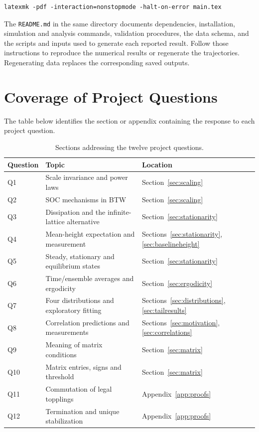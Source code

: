 \documentclass[11pt,a4paper,oneside]{report}
\numberwithin{equation}{chapter}
\begin{document}
\begin{lstlisting}
latexmk -pdf -interaction=nonstopmode -halt-on-error main.tex
\end{lstlisting}

The \texttt{README.md} in the same directory documents dependencies, installation, simulation and analysis commands, validation procedures, the data schema, and the scripts and inputs used to generate each reported result. Follow those instructions to reproduce the numerical results or regenerate the trajectories. Regenerating data replaces the corresponding saved outputs.
\FloatBarrier

\chapter{Coverage of Project Questions}
\label{app:coverage}
The table below identifies the section or appendix containing the response to each project question.
\begin{table}[htbp]
\centering
\caption{Sections addressing the twelve project questions.}
\label{tab:coverage}
\begin{tabularx}{\linewidth}{@{}lYl@{}}
\toprule
Question & Topic & Location\\
\midrule
Q1 & Scale invariance and power laws & Section~\ref{sec:scaling}\\
Q2 & SOC mechanisms in BTW & Section~\ref{sec:scaling}\\
Q3 & Dissipation and the infinite-lattice alternative & Section~\ref{sec:stationarity}\\
Q4 & Mean-height expectation and measurement & Sections~\ref{sec:stationarity}, \ref{sec:baselineheight}\\
Q5 & Steady, stationary and equilibrium states & Section~\ref{sec:stationarity}\\
Q6 & Time/ensemble averages and ergodicity & Section~\ref{sec:ergodicity}\\
Q7 & Four distributions and exploratory fitting & Sections~\ref{sec:distributions}, \ref{sec:tailresults}\\
Q8 & Correlation predictions and measurements & Sections~\ref{sec:motivation}, \ref{sec:correlations}\\
Q9 & Meaning of matrix conditions & Section~\ref{sec:matrix}\\
Q10 & Matrix entries, signs and threshold & Section~\ref{sec:matrix}\\
Q11 & Commutation of legal topplings & Appendix~\ref{app:proofs}\\
Q12 & Termination and unique stabilization & Appendix~\ref{app:proofs}\\
\bottomrule
\end{tabularx}
\end{table}
\FloatBarrier
\end{document}
